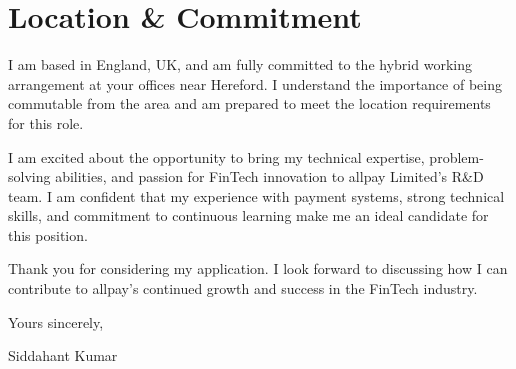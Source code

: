 \documentclass[letterpaper,10pt]{article}
\begin{document}
\section{Location \& Commitment}

I am based in England, UK, and am fully committed to the hybrid working arrangement at your offices near Hereford. I understand the importance of being commutable from the area and am prepared to meet the location requirements for this role.

I am excited about the opportunity to bring my technical expertise, problem-solving abilities, and passion for FinTech innovation to allpay Limited's R\&D team. I am confident that my experience with payment systems, strong technical skills, and commitment to continuous learning make me an ideal candidate for this position.

Thank you for considering my application. I look forward to discussing how I can contribute to allpay's continued growth and success in the FinTech industry.

\vspace{0.2in}

Yours sincerely,

\vspace{0.1in}

Siddahant Kumar
\end{document}
